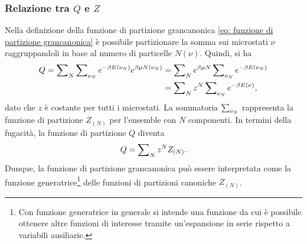 \subsubsection{Relazione tra $Q$ e $Z$}
Nella definizione della funzione di partizione grancanonica \eqref{eq: funzione di partizione grancanonica} è possibile partizionare la somma sui microstati $\nu$ raggruppandoli in base al numero di particelle $N(\nu)$. Quindi, si ha
\begin{equation}
     \begin{split}
         Q = \sum\nolimits_N\sum\nolimits_{\nu_N} e^{-\beta E(\nu_N)}e^{\beta\mu N(\nu_N)} &= \sum\nolimits_Ne^{\beta\mu N}\sum\nolimits_{\nu_N}e^{-\beta E(\nu_N)} \\
         &= \sum\nolimits_Nz^N\sum\nolimits_{\nu_N}e^{-\beta E(\nu)},
     \end{split}
\end{equation}
dato che $z$ è costante per tutti i microstati. La sommatoria $\sum\nolimits_{\nu_N}$ rappresenta la funzione di partizione $Z_{(N)}$ per l'ensemble con $N$ componenti. In termini della fugacità, la funzione di partizione $Q$ diventa
\begin{equation}
\label{eq: funzione di partizione grancanonica (fugacità)}
    Q = \sum\nolimits_N z^NZ_{(N)}.
\end{equation}
Dunque, la funzione di partizione grancanonica può essere interpretata come la funzione generatrice\footnote{Con funzione generatrice in generale si intende una funzione da cui è possibile ottenere altre funzioni di interesse tramite un'espansione in serie rispetto a variabili ausiliarie.} delle funzioni di partizioni canoniche $Z_{(N)}$. 